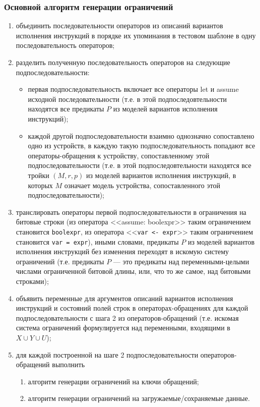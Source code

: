 \subsubsection*{Основной алгоритм генерации ограничений}
\begin{enumerate}
    \item объединить последовательности операторов из описаний вариантов исполнения инструкций в порядке их упоминания в тестовом шаблоне в одну последовательность операторов;
    \item разделить полученную последовательность операторов на следующие подпоследовательности:
            \begin{itemize}
                \item первая подпоследовательность включает все операторы let и assume исходной последовательности (т.е. в этой подпоследовтельности находятся все предикаты $P$ из моделей вариантов исполнения инструкций);
                \item каждой другой подпоследовательности взаимно однозначно сопоставлено одно из устройств, в каждую такую подпоследовательность попадают все операторы-обращения к устройству, сопоставленному этой подпоследовательности (т.е. в этой подпоследовтельности находятся все тройки $(M, r, p)$ из моделей вариантов исполнения инструкций, в которых $M$ означает модель устройства, сопоставленного этой подпоследовательности);
            \end{itemize}
    \item транслировать операторы первой подпоследовательности в ограничения на битовые строки (из оператора <<assume: boolexpr>> таким ограничением становится \texttt{boolexpr}, из оператора <<\texttt{var <- expr}>> таким ограничением становится \texttt{var = expr}), иными словами, предикаты $P$ из моделей вариантов исполнения инструкций без изменения переходят в искомую систему ограничений (т.е. предикаты $P$ --- это предикаты над переменными-целыми числами ограниченной битовой длины, или, что то же самое, над битовыми строками);
    \item объявить переменные для аргументов описаний вариантов исполнения инструкций и состояний полей строк в операторах-обращениях для каждой подпоследовательности с шага 2 из операторов-обращений (т.е. искомая система ограничений формулируется над переменными, входящими в $X \cup Y \cup U$);
    \item для каждой построенной на шаге 2 подпоследовательности операторов-обращений выполнить
            \begin{enumerate}
                \item алгоритм генерации ограничений на ключи обращений;
                \item алгоритм генерации ограничений на загружаемые/сохраняемые данные.
            \end{enumerate}
\end{enumerate}

